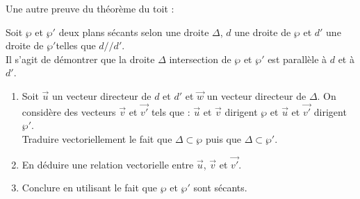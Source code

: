 \documentclass{cornouaille}
\begin{document}
  \begin{exercice}
    Une autre preuve du théorème du toit  :

    \begin{center}
    \end{center}

    Soit $\wp$ et $\wp'$ deux plans sécants selon une droite $\Delta$,
    $d$ une droite de $\wp$ et $d'$ une droite de $\wp'$telles que
    $d//d'$.  \\ Il s'agit de démontrer que la droite $\Delta$
    intersection de $\wp$ et $\wp'$ est parallèle à $d$ et à $d'$.
    \begin{enumerate}
    \item Soit $\vec{u}$ un vecteur directeur de $d$ et $d'$ et
      $\vec{w}$ un vecteur directeur de $\Delta$.  On considère des
      vecteurs $\vec{v}$ et $\vec{v'}$ tels que : $\vec{u}$ et
      $\vec{v}$ dirigent $\wp$ et
      $\vec{u}$ et $\vec{v'}$ dirigent $\wp'$.\\
      Traduire vectoriellement le fait que $\Delta\subset\wp$ puis que
      $\Delta\subset\wp'$.
    \item En déduire une relation vectorielle entre $\vec{u}$,
      $\vec{v}$ et $\vec{v'}$.
    \item Conclure en utilisant le fait que $\wp$ et $\wp'$ sont
      sécants.
    \end{enumerate}
  \end{exercice}
\end{document}
